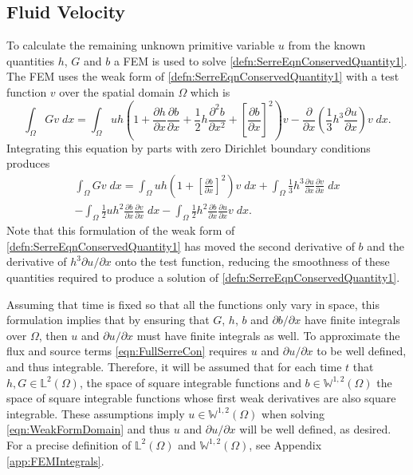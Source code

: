 \subsection{Fluid Velocity}
\label{subsec:FluidVelocity}
To calculate the remaining unknown primitive variable $u$ from the known quantities $h$, $G$ and $b$ a FEM is used to solve \eqref{defn:SerreEqnConservedQuantity1}. The FEM uses the weak form of \eqref{defn:SerreEqnConservedQuantity1} with a test function $v$ over the spatial domain $\Omega$ which is 
\begin{equation*}
	\int_{\Omega } G v \; dx =  \int_{\Omega } uh \left(1 + \frac{\partial h}{\partial x}\frac{\partial b}{\partial x} + \frac{1}{2}h\frac{\partial^2 b}{\partial x^2} +  \left[\frac{\partial b}{\partial x}\right]^2 \right) v - \frac{\partial}{\partial x}\left(\frac{1}{3}h^3  \frac{\partial {u}}{\partial x}\right) v \; dx.
\end{equation*}
Integrating this equation by parts with zero Dirichlet boundary conditions produces
\begin{multline}
\int_{\Omega } G v \; dx = \int_{\Omega } uh \left(1 + \left[\frac{\partial b}{\partial x}\right]^2 \right) v \; dx +  \int_{\Omega } \frac{1}{3}h^3  \frac{\partial {u}}{\partial x} \frac{\partial v}{\partial x} \; dx  \\ - 
\int_{\Omega }   \frac{1}{2} u h^2\frac{\partial b}{\partial x}  \frac{\partial v }{\partial x}\; dx - 
\int_{\Omega }   \frac{1}{2}h^2\frac{\partial b}{\partial x}  \frac{\partial u }{\partial x}v \; dx.
\label{eqn:WeakFormDomain}
\end{multline}
Note that this formulation of the weak form of \eqref{defn:SerreEqnConservedQuantity1} has moved the second derivative of $b$ and the derivative of $h^3 {\partial u}/{ \partial x}$ onto the test function, reducing the smoothness of these quantities required to produce a solution of \eqref{defn:SerreEqnConservedQuantity1}.


Assuming that time is fixed so that all the functions only vary in space, this formulation implies that by ensuring that $G$, $h$, $b$ and $\partial b / \partial x$ have finite integrals over $\Omega$, then $u$ and $\partial u / \partial x$ must have finite integrals as well. To approximate the flux and source terms \eqref{eqn:FullSerreCon} requires $u$ and $\partial u / \partial x$ to be well defined, and thus integrable. Therefore, it will be assumed that for each time $t$ that $h,G \in \mathbb{L}^2(\Omega)$, the space of square integrable functions and $b \in\mathbb{W}^{1,2}(\Omega)$ the space of square integrable functions whose first weak derivatives are also square integrable. These assumptions imply $u \in \mathbb{W}^{1,2}(\Omega) $ when solving \eqref{eqn:WeakFormDomain} and thus $u$ and $\partial u / \partial x$ will be well defined, as desired. For a precise definition of $\mathbb{L}^2(\Omega)$ and $\mathbb{W}^{1,2}(\Omega)$, see Appendix \ref{app:FEMIntegrals}.


